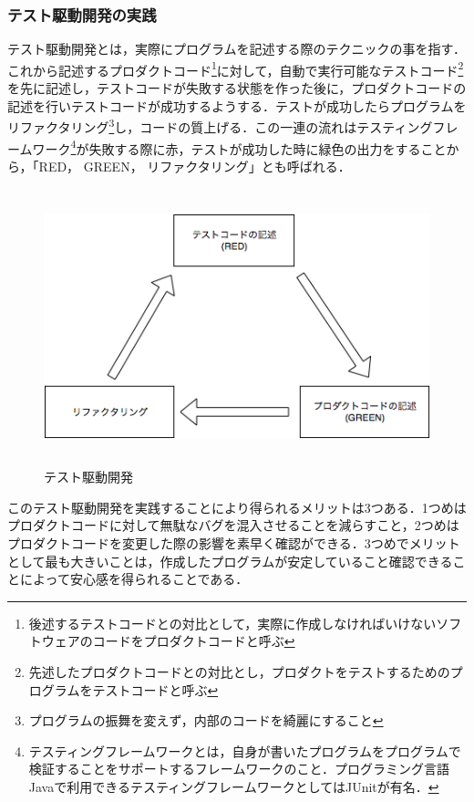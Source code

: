\subsubsection{テスト駆動開発の実践}

テスト駆動開発とは，実際にプログラムを記述する際のテクニックの事を指す．これから記述するプロダクトコード\footnote{後述するテストコードとの対比として，実際に作成しなければいけないソフトウェアのコードをプロダクトコードと呼ぶ}に対して，自動で実行可能なテストコード\footnote{先述したプロダクトコードとの対比とし，プロダクトをテストするためのプログラムをテストコードと呼ぶ}を先に記述し，テストコードが失敗する状態を作った後に，プロダクトコードの記述を行いテストコードが成功するようする．テストが成功したらプログラムをリファクタリング\footnote{プログラムの振舞を変えず，内部のコードを綺麗にすること}し，コードの質上げる．この一連の流れはテスティングフレームワーク\footnote{テスティングフレームワークとは，自身が書いたプログラムをプログラムで検証することをサポートするフレームワークのこと．プログラミング言語Javaで利用できるテスティングフレームワークとしてはJUnitが有名．}が失敗する際に赤，テストが成功した時に緑色の出力をすることから，「RED， GREEN， リファクタリング」とも呼ばれる．

\begin{figure}[H]
\centering
\includegraphics[height=8cm]{./assets/images/tdd.png}
\caption{テスト駆動開発}
\label{fig:tdd}
\end{figure}


このテスト駆動開発を実践することにより得られるメリットは3つある．1つめはプロダクトコードに対して無駄なバグを混入させることを減らすこと，2つめはプロダクトコードを変更した際の影響を素早く確認ができる．3つめでメリットとして最も大きいことは，作成したプログラムが安定していること確認できることによって安心感を得られることである．

